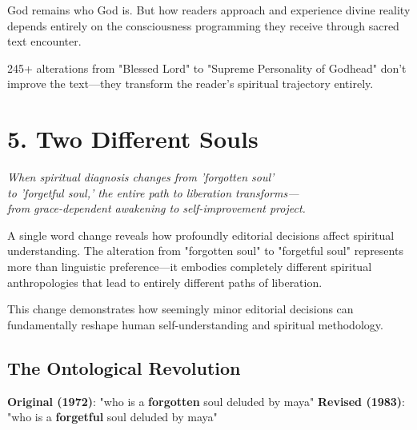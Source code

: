\documentclass[11pt,twoside]{book}
\begin{document}
God remains who God is. But how readers approach and experience divine reality depends entirely on the consciousness programming they receive through sacred text encounter.

245+ alterations from "Blessed Lord" to "Supreme Personality of Godhead" don't improve the text—they transform the reader's spiritual trajectory entirely.
\chapter*{5. Two Different Souls}
\label{sec:org8db351c}

{\centering\itshape When spiritual diagnosis changes from 'forgotten soul'\\to 'forgetful soul,' the entire path to liberation transforms—\\from grace-dependent awakening to self-improvement project.\par}
\vspace{0.3cm}

\normalfont\justifying
A single word change reveals how profoundly editorial decisions affect spiritual understanding. The alteration from "forgotten soul" to "forgetful soul" represents more than linguistic preference—it embodies completely different spiritual anthropologies that lead to entirely different paths of liberation.

This change demonstrates how seemingly minor editorial decisions can fundamentally reshape human self-understanding and spiritual methodology.
\section*{The Ontological Revolution}
\label{sec:orgffac321}

\textbf{\textbf{Original (1972)}}: "who is a \textbf{\textbf{\textbf{forgotten}}} soul deluded by maya"
\textbf{\textbf{Revised (1983)}}: "who is a \textbf{\textbf{\textbf{forgetful}}} soul deluded by maya"
\end{document}
